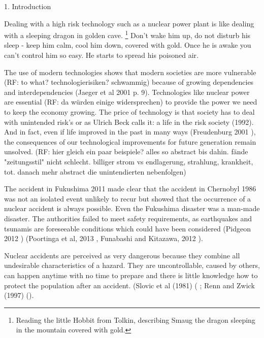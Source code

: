 1. Introduction   


Dealing with a high risk technology such as a nuclear power plant is like dealing with a sleeping dragon in  golden cave. \footnote{Reading the little Hobbit from Tolkin, describing Smaug the dragon sleeping in the mountain covered with gold.}  Don't wake him up, do not disturb his sleep - keep him calm, cool him down, covered with gold. Once he is awake you can't control him so easy. He starts to spread his poisoned air.  


The use of modern technologies shows that modern societies are more vulnerable (RF: to what? technologierisiken? schwammig) because of growing dependencies and interdependencies (Jaeger et al 2001 p. 9). Technologies like nuclear power are essential (RF: da würden einige widersprechen) to provide the power we need to keep the economy growing. The price of technology is that society has to deal with unintended risk's or as Ulrich Beck calls it: a life in the risk society (1992). And in fact, even if life improved in the past in many ways (Freudenburg 2001 \citep{Freudenburg:2001cs}), the consequences of our technological improvements for future generation remain unsolved. (RF: hier gleich ein paar beispiele? alles so abstract bis dahin. fände "zeitungsstil" nicht schlecht. billiger strom vs endlagerung, strahlung, krankheit, tot. danach mehr abstract die unintendierten nebenfolgen)

The accident in Fukushima 2011 made clear that the accident in Chernobyl 1986 was not an isolated event unlikely to recur but showed that the occurrence of a nuclear accident is always possible. Even the Fukushima disaster was a man-made disaster. The authorities failed to meet safety requirements, as earthquakes and tsunamis are foreseeable conditions which could have been considered (Pidgeon 2012 \citep{Pidgeon:2012ud})  (Poortinga et al, 2013 \citep{Poortinga:2013gt}, Funabashi and Kitazawa, 2012 \citep{Funabashi:2012fs}). 

Nuclear accidents are perceived as very dangerous because they combine all undesirable characteristics of a hazard. They are uncontrollable, caused by others, can happen anytime with no time to prepare and there is little knowledge how to protect the population after an accident. (Slovic et al (1981) ( \citep{Slovic:1981fe}; Renn and Zwick (1997) (\citep{Renn:1997tx, Slovic:1981fe}).   


